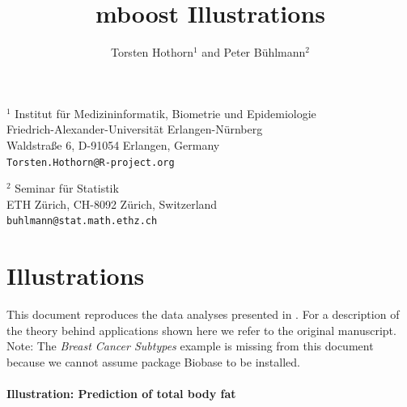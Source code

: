 \documentclass{article}
\newcommand{\Rpackage}[1]{{\normalfont\fontseries{b}\selectfont #1}}
\begin{document}

\title{\Rpackage{mboost} Illustrations}

\author{Torsten Hothorn$^1$ and Peter B\"uhlmann$^2$}

\date{}

\maketitle

\noindent$^1$ Institut f\"ur Medizininformatik, Biometrie und Epidemiologie\\
           Friedrich-Alexander-Universit\"at Erlangen-N\"urnberg\\
           Waldstra{\ss}e 6, D-91054 Erlangen, Germany \\
           \texttt{Torsten.Hothorn@R-project.org}
           \newline

\noindent$^2$ Seminar f{\"u}r Statistik \\ 
              ETH Z\"urich, CH-8092 Z{\"u}rich, Switzerland \\
              \texttt{buhlmann@stat.math.ethz.ch}
           \newline

\section{Illustrations}

This document reproduces the data analyses presented in
\cite{BuhlmannHothorn06}. For a description of the theory behind
applications shown here we refer to the original manuscript.
Note: The \textit{Breast Cancer Subtypes} example is missing from this
document because we cannot assume package \Rpackage{Biobase} to be
installed.

 

\paragraph{Illustration: Prediction of total body fat}

\end{document}
